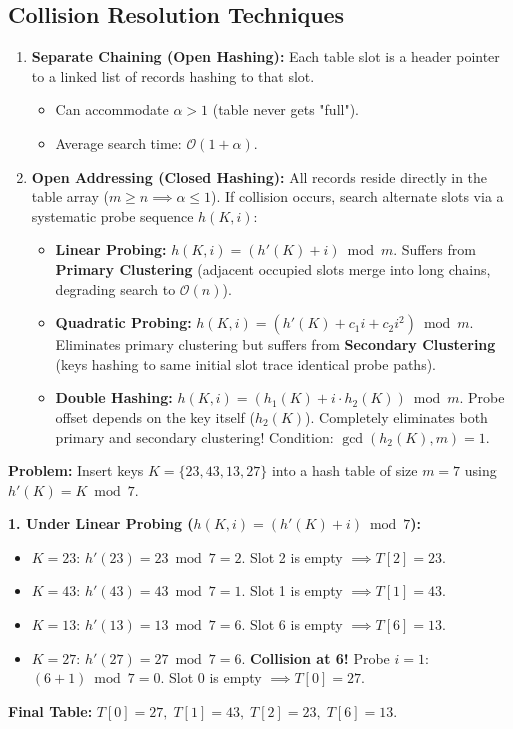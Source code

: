\documentclass[12pt,a4paper]{article}
\begin{document}
\subsection{Collision Resolution Techniques}
\begin{enumerate}[leftmargin=*, itemsep=4pt]
  \item \textbf{Separate Chaining (Open Hashing):} Each table slot is a header pointer to a linked list of records hashing to that slot.
  \begin{itemize}[leftmargin=*, nosep]
    \item Can accommodate $\alpha > 1$ (table never gets "full").
    \item Average search time: $\mathcal{O}(1 + \alpha)$.
  \end{itemize}
  \item \textbf{Open Addressing (Closed Hashing):} All records reside directly in the table array ($m \ge n \implies \alpha \le 1$). If collision occurs, search alternate slots via a systematic probe sequence $h(K, i)$:
  \begin{itemize}[leftmargin=*, itemsep=2pt]
    \item \textbf{Linear Probing:} $h(K, i) = (h'(K) + i) \bmod m$. Suffers from \textbf{Primary Clustering} (adjacent occupied slots merge into long chains, degrading search to $\mathcal{O}(n)$).
    \item \textbf{Quadratic Probing:} $h(K, i) = (h'(K) + c_1 i + c_2 i^2) \bmod m$. Eliminates primary clustering but suffers from \textbf{Secondary Clustering} (keys hashing to same initial slot trace identical probe paths).
    \item \textbf{Double Hashing:} $h(K, i) = (h_1(K) + i \cdot h_2(K)) \bmod m$. Probe offset depends on the key itself ($h_2(K)$). Completely eliminates both primary and secondary clustering! Condition: $\gcd(h_2(K), m) = 1$.
  \end{itemize}
\end{enumerate}

\begin{tcolorbox}[examplebox, title={\textbf{Exam Numerical: Collision Resolution Walkthrough}}]
\textbf{Problem:} Insert keys $K = \{23, 43, 13, 27\}$ into a hash table of size $m = 7$ using $h'(K) = K \bmod 7$.
\par\vspace{2pt}\noindent
\textbf{1. Under Linear Probing ($h(K, i) = (h'(K) + i) \bmod 7$):}
\begin{itemize}[leftmargin=*, nosep]
  \item $K = 23$: $h'(23) = 23 \bmod 7 = 2$. Slot 2 is empty $\implies T[2] = 23$.
  \item $K = 43$: $h'(43) = 43 \bmod 7 = 1$. Slot 1 is empty $\implies T[1] = 43$.
  \item $K = 13$: $h'(13) = 13 \bmod 7 = 6$. Slot 6 is empty $\implies T[6] = 13$.
  \item $K = 27$: $h'(27) = 27 \bmod 7 = 6$. \textbf{Collision at 6!} Probe $i=1$: $(6 + 1) \bmod 7 = 0$. Slot 0 is empty $\implies T[0] = 27$.
\end{itemize}
\textbf{Final Table:} $T[0]=27, \; T[1]=43, \; T[2]=23, \; T[6]=13$.
\end{tcolorbox}
\end{document}
